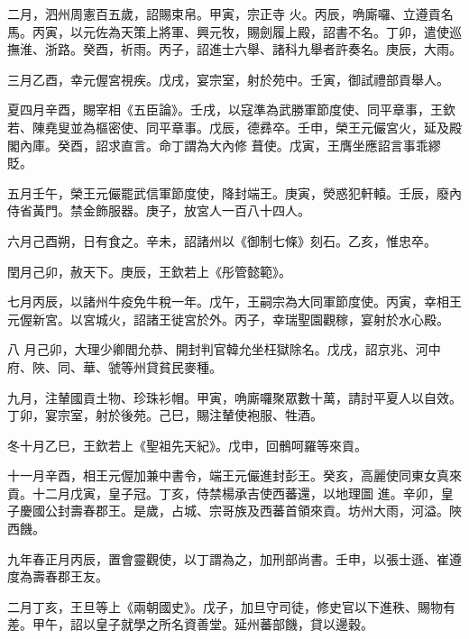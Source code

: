 \begin{pinyinscope}
 二月，泗州周憲百五歲，詔賜束帛。甲寅，宗正寺
 火。丙辰，唃廝囉、立遵貢名馬。丙寅，以元佐為天策上將軍、興元牧，賜劍履上殿，詔書不名。丁卯，遣使巡撫淮、浙路。癸酉，祈雨。丙子，詔進士六舉、諸科九舉者許奏名。庚辰，大雨。



 三月乙酉，幸元偓宮視疾。戊戌，宴宗室，射於苑中。壬寅，御試禮部貢舉人。



 夏四月辛酉，賜宰相《五臣論》。壬戌，以寇準為武勝軍節度使、同平章事，王欽若、陳堯叟並為樞密使、同平章事。戊辰，德彞卒。壬申，榮王元儼宮火，延及殿閣內庫。癸酉，詔求直言。命丁謂為大內修
 葺使。戊寅，王膺坐應詔言事乖繆貶。



 五月壬午，榮王元儼罷武信軍節度使，降封端王。庚寅，熒惑犯軒轅。壬辰，廢內侍省黃門。禁金飾服器。庚子，放宮人一百八十四人。



 六月己酉朔，日有食之。辛未，詔諸州以《御制七條》刻石。乙亥，惟忠卒。



 閏月己卯，赦天下。庚辰，王欽若上《彤管懿範》。



 七月丙辰，以諸州牛疫免牛稅一年。戊午，王嗣宗為大同軍節度使。丙寅，幸相王元偓新宮。以宮城火，詔諸王徙宮於外。丙子，幸瑞聖園觀稼，宴射於水心殿。



 八
 月己卯，大理少卿閻允恭、開封判官韓允坐枉獄除名。戊戌，詔京兆、河中府、陜、同、華、虢等州貸貧民麥種。



 九月，注輦國貢土物、珍珠衫帽。甲寅，唃廝囉聚眾數十萬，請討平夏人以自效。丁卯，宴宗室，射於後苑。己巳，賜注輦使袍服、牲酒。



 冬十月乙巳，王欽若上《聖祖先天紀》。戊申，回鶻呵羅等來貢。



 十一月辛酉，相王元偓加兼中書令，端王元儼進封彭王。癸亥，高麗使同東女真來貢。十二月戊寅，皇子冠。丁亥，侍禁楊承吉使西蕃還，以地理圖
 進。辛卯，皇子慶國公封壽春郡王。是歲，占城、宗哥族及西蕃首領來貢。坊州大雨，河溢。陜西饑。



 九年春正月丙辰，置會靈觀使，以丁謂為之，加刑部尚書。壬申，以張士遜、崔遵度為壽春郡王友。



 二月丁亥，王旦等上《兩朝國史》。戊子，加旦守司徒，修史官以下進秩、賜物有差。甲午，詔以皇子就學之所名資善堂。延州蕃部饑，貸以邊穀。




\end{pinyinscope}
